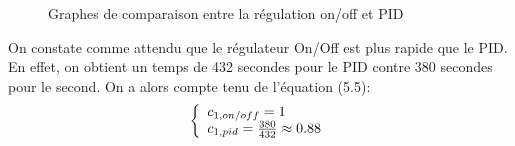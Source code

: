 \documentclass[12pt]{report}
\begin{document}
\begin{center}
\begin{figure}[H]
    \begin{minipage}[t]{8cm}
        \centering
    \end{minipage}\hfill
    \begin{minipage}[t]{8cm}
        \centering
    \end{minipage}
    \caption{\label{comp1} Graphes de comparaison entre la régulation on/off et PID}
\end{figure}
\end{center}

On constate comme attendu que le régulateur On/Off est plus rapide que le PID. En effet, on obtient un temps de 432 secondes pour le PID contre 380 secondes pour le second. On a alors compte tenu de l'équation (5.5):
\[\left\{ 
\begin{array}{l l}
c_{1, on/off} = 1 \\
c_{1, pid} = \frac{380}{432} \approx 0.88\\ 
\end{array} 
\right. \]
\end{document}
